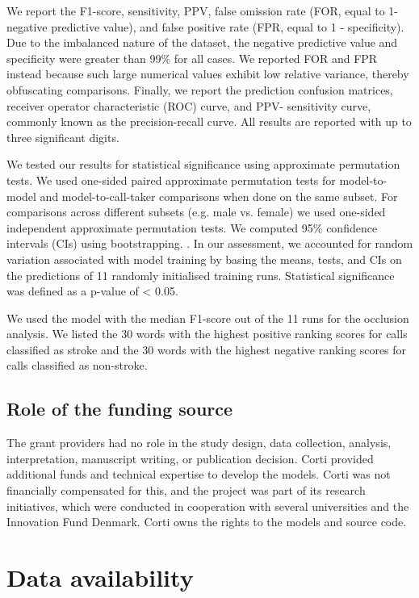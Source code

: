 {We report the F1-score, sensitivity, PPV, false omission rate (FOR, equal to 1- negative predictive value), and false positive rate (FPR, equal to 1 - specificity). Due to the imbalanced nature of the dataset, the negative predictive value and specificity were greater than 99\% for all cases. We reported FOR and FPR instead because such large numerical values exhibit low relative variance, thereby obfuscating comparisons. Finally, we report the prediction confusion matrices, receiver operator characteristic (ROC) curve, and PPV- sensitivity curve, commonly known as the precision-recall curve. All results are reported with up to three significant digits.

We tested our results for statistical significance using approximate permutation tests. We used one-sided paired approximate permutation tests for model-to-model and model-to-call-taker comparisons when done on the same subset. For comparisons across different subsets (e.g. male vs. female) we used one-sided independent approximate permutation tests. We computed 95\% confidence intervals (CIs) using bootstrapping. \parencite{dwass_modified_1957,eden_validity_1933}. In our assessment, we accounted for random variation associated with model training by basing the means, tests, and CIs on the predictions of 11 randomly initialised training runs. Statistical significance was defined as a p-value of < 0.05.

We used the model with the median F1-score out of the 11 runs for the occlusion analysis. We listed the 30 words with the highest positive ranking scores for calls classified as stroke and the 30 words with the highest negative ranking scores for calls classified as non-stroke.


\subsection{Role of the funding source}

The grant providers had no role in the study design, data collection, analysis, interpretation, manuscript writing, or publication decision. Corti provided additional funds and technical expertise to develop the models. Corti was not financially compensated for this, and the project was part of its research initiatives, which were conducted in cooperation with several universities and the Innovation Fund Denmark. Corti owns the rights to the models and source code.


\section{Data availability}

}
